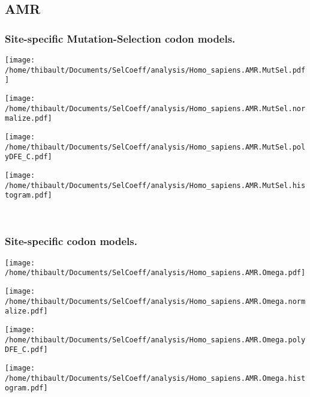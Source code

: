 \subsection{AMR} 
 
\subsubsection*{Site-specific Mutation-Selection codon models.} 
\begin{minipage}{0.49\linewidth} 
\texttt{[image: /home/thibault/Documents/SelCoeff/analysis/Homo\_sapiens.AMR.MutSel.pdf]} 
\end{minipage}
\begin{minipage}{0.49\linewidth} 
\texttt{[image: /home/thibault/Documents/SelCoeff/analysis/Homo\_sapiens.AMR.MutSel.normalize.pdf]} 
\end{minipage}
\begin{minipage}{0.49\linewidth} 
\texttt{[image: /home/thibault/Documents/SelCoeff/analysis/Homo\_sapiens.AMR.MutSel.polyDFE\_C.pdf]} 
\end{minipage}
\begin{minipage}{0.49\linewidth} 
\texttt{[image: /home/thibault/Documents/SelCoeff/analysis/Homo\_sapiens.AMR.MutSel.histogram.pdf]} 
\end{minipage}
\\ 
\subsubsection*{Site-specific codon models.} 
\begin{minipage}{0.49\linewidth} 
\texttt{[image: /home/thibault/Documents/SelCoeff/analysis/Homo\_sapiens.AMR.Omega.pdf]} 
\end{minipage}
\begin{minipage}{0.49\linewidth} 
\texttt{[image: /home/thibault/Documents/SelCoeff/analysis/Homo\_sapiens.AMR.Omega.normalize.pdf]} 
\end{minipage}
\begin{minipage}{0.49\linewidth} 
\texttt{[image: /home/thibault/Documents/SelCoeff/analysis/Homo\_sapiens.AMR.Omega.polyDFE\_C.pdf]} 
\end{minipage}
\begin{minipage}{0.49\linewidth} 
\texttt{[image: /home/thibault/Documents/SelCoeff/analysis/Homo\_sapiens.AMR.Omega.histogram.pdf]} 
\end{minipage}
\\ 
